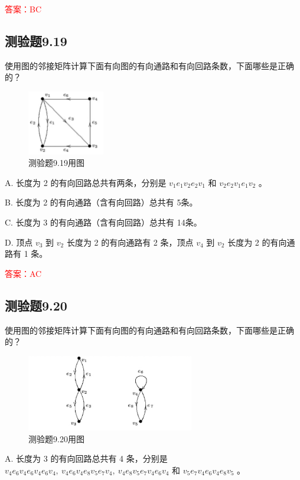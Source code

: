 \documentclass[UTF8, heading=true]{ctexart}
\begin{document}
\textcolor{red}{答案：BC}

\subsection{测验题9.19}

使用图的邻接矩阵计算下面有向图的有向通路和有向回路条数，下面哪些是正确的？

\begin{figure}[H]
  \centering
  \includegraphics[width=0.3\textwidth]{9.19.jpg} %
  \caption{测验题9.19用图}
\end{figure}

A. 长度为 2 的有向回路总共有两条，分别是 $v_1 e_1 v_2 e_2 v_1$ 和 $v_2 e_2 v_1 e_1 v_2$ 。

B. 长度为 2 的有向通路（含有向回路）总共有 5条。

C. 长度为 3 的有向通路（含有向回路）总共有 14条。

D. 顶点 $v_3$ 到 $v_2$ 长度为 2 的有向通路有 2 条，顶点 $v_4$ 到 $v_2$ 长度为 2 的有向通路有 1 条。

\textcolor{red}{答案：AC}

\subsection{测验题9.20}

使用图的邻接矩阵计算下面有向图的有向通路和有向回路条数，下面哪些是正确的？

\begin{figure}[H]
  \centering
  \includegraphics[width=0.65\textwidth]{9.20.jpg} %
  \caption{测验题9.20用图}
\end{figure}


A. 长度为 3 的有向回路总共有 4 条，分别是 $v_4 e_6 v_4 e_6 v_4 e_6 v_4, ~ v_4 e_6 v_4 e_8 v_5 e_7 v_4, ~ v_4 e_8 v_5 e_7 v_4 e_6 v_4$ 和 $v_5 e_7 v_4 e_6 v_4 e_8 v_5$ 。
\end{document}
